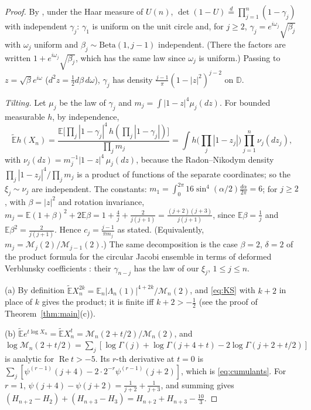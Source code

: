 \documentclass[12pt]{amsart}
\theoremstyle{remark}
\newcommand{\E}{\mathbb{E}}
\newcommand{\Et}{\widetilde{\mathbb{E}}}
\newcommand{\1}{\mathbf{1}}
\begin{document}
\begin{proof}
By \cite[Prop.~2.2]{BHNY08}, under the Haar measure of $U(n)$,
$\det(1-U)\overset{d}{=}\prod_{j=1}^n(1-\gamma_j)$ with independent
$\gamma_j$: $\gamma_1$ is uniform on the unit circle and, for $j\ge2$,
$\gamma_j=e^{i\omega_j}\sqrt{\beta_j}$ with $\omega_j$ uniform and
$\beta_j\sim\mathrm{Beta}(1,j-1)$ independent. (There the factors are
written $1+e^{i\omega_j}\sqrt{\beta_j}$, which has the same law since
$\omega_j$ is uniform.) Passing to $z=\sqrt\beta e^{i\omega}$
($d^2z=\frac12d\beta\,d\omega$), $\gamma_j$ has density
$\frac{j-1}{\pi}(1-|z|^2)^{j-2}$ on $\mathbb D$.

\emph{Tilting.} Let $\mu_j$ be the law of $\gamma_j$ and
$m_j=\int|1-z|^4\mu_j(dz)$. For bounded measurable $h$, by independence,
\[
\Et h(X_n)=\frac{\E\big[\prod_j|1-\gamma_j|^4\,h(\prod_j|1-\gamma_j|)\big]}
{\prod_jm_j}
=\int h\Big(\prod_j|1-z_j|\Big)\prod_{j=1}^n\nu_j(dz_j),
\]
with $\nu_j(dz)=m_j^{-1}|1-z|^4\,\mu_j(dz)$,
because the Radon--Nikodym density $\prod_j|1-z_j|^4/\prod_jm_j$ is a
product of functions of the separate coordinates; so the $\xi_j\sim\nu_j$
are independent. The constants: $m_1=\int_0^{2\pi}16\sin^4(\alpha/2)
\frac{d\alpha}{2\pi}=6$; for $j\ge2$, with $\beta=|z|^2$ and rotation
invariance, $m_j=\E(1+\beta)^2+2\E\beta=1+\frac4j+\frac2{j(j+1)}
=\frac{(j+2)(j+3)}{j(j+1)}$, since $\E\beta=\frac1j$ and
$\E\beta^2=\frac2{j(j+1)}$. Hence $c_j=\frac{j-1}{\pi m_j}$ as stated.
(Equivalently, $m_j=\mathcal M_j(2)/\mathcal M_{j-1}(2)$.) The same
decomposition is the case $\beta=2$, $\delta=2$ of the product formula for
the circular Jacobi ensemble in terms of deformed Verblunsky coefficients
\cite[Thm.~3.2 and Prop.~4.3]{BNR09}: their $\gamma_{n-j}$ has the law of
our $\xi_j$, $1\le j\le n$.

(a) By definition $\Et X_n^{2k}=\E_n|\Lambda_n(1)|^{4+2k}/\mathcal M_n(2)$,
and \eqref{eq:KS} with $k+2$ in place of $k$ gives the product; it is
finite iff $k+2>-\frac12$ (see the proof of Theorem~\ref{thm:main}(c)).

(b) $\Et e^{t\log X_n}=\Et X_n^{t}=\mathcal M_n(2+t/2)/\mathcal M_n(2)$,
and $\log\mathcal M_n(2+t/2)=\sum_j[\log\Gamma(j)+\log\Gamma(j+4+t)
-2\log\Gamma(j+2+t/2)]$ is analytic for $\operatorname{Re}t>-5$. Its
$r$-th derivative at $t=0$ is
$\sum_j[\psi^{(r-1)}(j+4)-2\cdot2^{-r}\psi^{(r-1)}(j+2)]$, which is
\eqref{eq:cumulants}. For $r=1$, $\psi(j+4)-\psi(j+2)=\frac1{j+2}+\frac1{j+3}$,
and summing gives $(H_{n+2}-H_2)+(H_{n+3}-H_3)=H_{n+2}+H_{n+3}-\frac{10}3$.
\end{proof}
\end{document}
